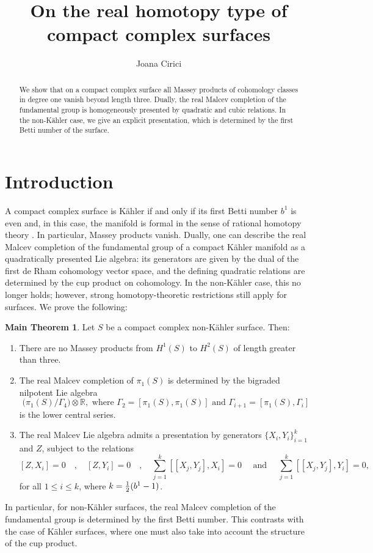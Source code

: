 \documentclass[a4paper]{amsart}
\author{Joana Cirici}
\title{On the real homotopy type
of compact complex surfaces}
\theoremstyle{definition}
\begin{document}
\maketitle 


\begin{abstract}
We show that on a compact complex surface all Massey products of cohomology classes in degree one vanish beyond length three. Dually, the real Malcev completion of the fundamental group is homogeneously presented by quadratic and cubic relations.
In the non-Kähler case, we give an explicit presentation, which is determined by the first Betti number of the surface.
\end{abstract}

\section{Introduction}
A compact complex surface is Kähler if and only if its first Betti number \(b^1\) is even and, in this case, the manifold is formal in the sense of rational homotopy theory \cite{DGMS}. In particular, Massey products vanish.
Dually, one can describe the real Malcev completion of the fundamental group of a compact Kähler manifold as a  quadratically presented Lie algebra: its generators are given by the dual of the first de Rham cohomology vector space, and the defining quadratic relations are determined by the cup product on cohomology.
In the non-Kähler case, this no longer holds; however, strong homotopy-theoretic restrictions still apply for surfaces. We prove the following:

\theoremstyle{theorem}
\newtheorem*{maint}{\normalfont\bfseries Main Theorem}\label{mainintro}
\begin{maint}
Let \(S\) be a compact complex non-Kähler surface. Then:
\begin{enumerate}
    \item There are no Massey products from \(H^1(S)\) to \(H^2(S)\) of length greater than three.
    \item The real Malcev completion of \(\pi_1(S)\) is determined by the bigraded nilpotent Lie algebra
    \[\bigl(\pi_1(S)/\Gamma_4 \bigr) \otimes \mathbb{R},\text{ where } \Gamma_2 = [\pi_1(S), \pi_1(S)]\text{ and }\Gamma_{i+1} = [\pi_1(S), \Gamma_i]\] is the lower central series.
    \item
    The real Malcev Lie algebra
    admits a presentation by generators $\{X_i,Y_i\}_{i=1}^k$ and $Z$, subject to the relations
 \[[Z,X_i]=0\quad,\quad[Z,Y_i]=0\quad,\quad \sum_{j=1}^k [[X_j,Y_j],X_i]=0\quad\text{ and }\quad\sum_{j=1}^k [[X_j,Y_j],Y_i]=0,\]
 for all $1\leq i\leq k$, where $k={1\over 2}(b^1-1)$.
\end{enumerate}
\end{maint}
In particular, for non-Kähler surfaces, the real Malcev completion of the fundamental group is determined by the first Betti number. This contrasts with the case of Kähler surfaces, where one must also take into account the structure of the cup product.
\end{document}
